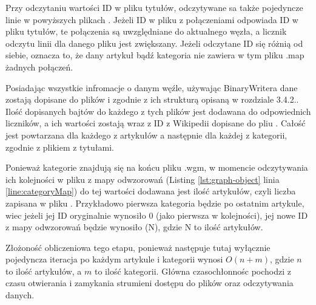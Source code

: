 Przy odczytaniu wartości ID w pliku tytułów, odczytywane sa także pojedyncze linie w powyższych plikach . Jeżeli ID w pliku z połączeniami odpowiada ID w pliku tytułów, te połączenia są uwzględniane do aktualnego węzła, a licznik odczytu linii dla danego pliku jest zwiększany. Jeżeli odczytane ID się różnią od siebie, oznacza to, że dany artykuł bądź kategoria nie zawiera w tym pliku .map żadnych połączeń.

Posiadając wszystkie infromacje o danym węźle, używając BinaryWritera dane zostają dopisane do plików  i  zgodnie z ich strukturą opisaną w rozdziale 3.4.2.. Ilość dopisanych bajtów do każdego z tych plików jest dodawana do odpowiednich liczników, a ich wartości zostają wraz z ID z Wikipedii dopisane do pliu . Całość jest powtarzana dla każdego z artykułów a następnie dla każdej z kategorii, zgodnie z plikiem z tytułami.

Ponieważ kategorie znajdują się na końcu pliku .wgm, w momencie odczytywania ich kolejności w pliku  z mapy odwzorowań (Listing \ref{lst:graph-object} linia \ref{line:categoryMap}) do tej wartości dodawana jest ilość artykułów, czyli liczba zapisana w pliku . Przykładowo pierwsza kategoria będzie po ostatnim artykule, wiec jeżeli jej ID oryginalnie wynosiło 0 (jako pierwsza w kolejności), jej nowe ID z mapy odwzorowań będzie wynosiło (N), gdzie N to ilość artykułów.

Złożoność obliczeniowa tego etapu, ponieważ następuje tutaj wyłącznie pojedyncza iteracja po każdym artykule i kategorii wynosi $O(n+m)$, gdzie $n$ to ilość artykułów, a $m$ to ilość kategorii. Główna czasochłonnośc pochodzi z czasu otwierania i zamykania strumieni dostępu do plików oraz odczytywania danych.